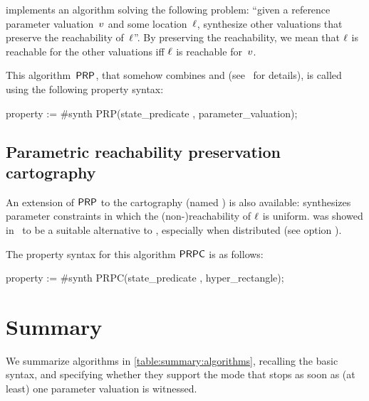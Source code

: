 \imitator{} implements an algorithm solving the following problem:
``given a reference parameter valuation~$v$ and some location~$\ell$, synthesize other valuations that preserve the reachability of~$\ell$''.
By preserving the reachability, we mean that $\ell$ is reachable for the other valuations iff $\ell$ is reachable for~$v$.

This algorithm~$\mathsf{PRP}$, that somehow combines \EFsynth{} and \IM{} (see~\cite{ALNS15} for details), is called using the following property syntax:

\begin{IMITATORproperty}
property := #synth PRP(state_predicate , parameter_valuation);
\end{IMITATORproperty}



\subsection*{Parametric reachability preservation cartography}\label{sss:mode:PRPC}

An extension of $\mathsf{PRP}$ to the cartography (named \PRPC{}) is also available: \PRPC{} synthesizes parameter constraints in which the (non-)reachability of $\ell$ is uniform.
\PRPC{} was showed in~\cite{ALNS15} to be a suitable alternative to \EFsynth{}, especially when distributed (see option ).

The property syntax for this algorithm $\mathsf{PRPC}$ is as follows:

\begin{IMITATORproperty}
property := #synth PRPC(state_predicate , hyper_rectangle);
\end{IMITATORproperty}



\section{Summary}\label{ss:mode:summary}

We summarize algorithms in \cref{table:summary:algorithms}, recalling the basic syntax, and specifying whether they support the  mode that stops as soon as (at least) one parameter valuation is witnessed.

